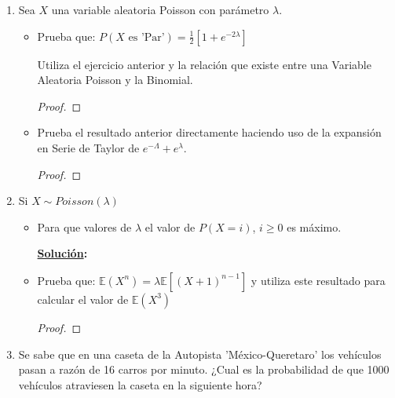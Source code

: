 \documentclass[11pt,letterpaper]{report}
\newcommand{\sol}{\textbf{\underline{Solución}: }} %
\begin{document}
\begin{enumerate}
\begin{proof}
    
\end{proof}

\item Sea $X$ una variable aleatoria Poisson con parámetro $\lambda$.
\begin{itemize}
    \item Prueba que: $P(X \text{ es 'Par'}) = \frac{1}{2}[1+e^{-2\lambda}]$
    
    Utiliza el ejercicio anterior y la relación que existe entre una Variable Aleatoria Poisson y la Binomial.

    \begin{proof}
        
    \end{proof}
    
    \item Prueba el resultado anterior directamente haciendo uso de la expansión en Serie de Taylor de $e^{-\Lambda}+e^{\lambda}$.
    
    \begin{proof}
        
    \end{proof}
    
\end{itemize}

\item Si $X \sim Poisson(\lambda)$

\begin{itemize}    
    \item Para que valores de $\lambda$ el valor de $P(X=i)$, $i \geq 0$ es máximo.
    
    \sol
    
    \item Prueba que: $\mathds{E}(X^{n}) = \lambda \mathds{E}[(X+1)^{n-1}]$ y utiliza este resultado para calcular el
    valor de $\mathds{E}(X^3)$

    \begin{proof}
        
    \end{proof}

\end{itemize}

\item Se sabe que en una caseta de la Autopista 'México-Queretaro' los vehículos pasan a razón de 16 carros por minuto.
¿Cual es la probabilidad de que 1000 vehículos atraviesen la caseta en la siguiente hora?


\end{enumerate}
\end{document}
